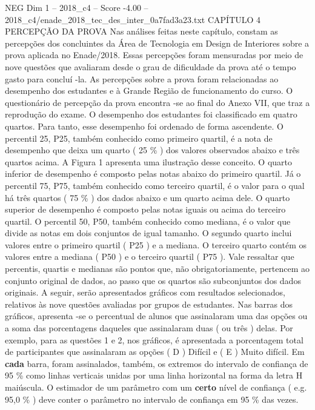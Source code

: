 \begin{textsample}{NEG Dim 1 – 2018\_c4 – Score -4.00 – 2018\_c4/enade\_2018\_tec\_des\_inter\_0a7fad3a23.txt}  \label{ex:f1_neg_132}
CAPÍTULO 4 PERCEPÇÃO DA PROVA Nas análises feitas neste capítulo, constam as percepções dos concluintes da Área de Tecnologia em Design de Interiores sobre a prova aplicada no Enade/2018.
Essas percepções foram mensuradas por meio de nove questões que avaliaram desde o grau de dificuldade da prova até o tempo gasto para concluí -la.
As percepções sobre a prova foram relacionadas ao desempenho dos estudantes e à Grande Região de funcionamento do curso.
O questionário de percepção da prova encontra -se ao final do Anexo VII, que traz a reprodução do exame.
O desempenho dos estudantes foi classificado em quatro quartos.
Para tanto, esse desempenho foi ordenado de forma ascendente.
O percentil 25, P25, também conhecido como primeiro quartil, é a nota de desempenho que deixa um quarto ( 25 \% ) dos valores observados abaixo e três quartos acima.
A Figura 1 apresenta uma ilustração desse conceito.
O quarto inferior de desempenho é composto pelas notas abaixo do primeiro quartil.
Já o percentil 75, P75, também conhecido como terceiro quartil, é o valor para o qual há três quartos ( 75 \% ) dos dados abaixo e um quarto acima dele.
O quarto superior de desempenho é composto pelas notas iguais ou acima do terceiro quartil.
O percentil 50, P50, também conhecido como mediana, é o valor que divide as notas em dois conjuntos de igual tamanho.
O segundo quarto inclui valores entre o primeiro quartil ( P25 ) e a mediana.
O terceiro quarto contém os valores entre a mediana ( P50 ) e o terceiro quartil ( P75 ).
Vale ressaltar que percentis, quartis e medianas são pontos que, não obrigatoriamente, pertencem ao conjunto original de dados, ao passo que os quartos são subconjuntos dos dados originais.
A seguir, serão apresentados gráficos com resultados selecionados, relativos às nove questões avaliadas por grupos de estudantes.
Nas barras dos gráficos, apresenta -se o percentual de alunos que assinalaram uma das opções ou a soma das porcentagens daqueles que assinalaram duas ( ou três ) delas.
Por exemplo, para as questões 1 e 2, nos gráficos, é apresentada a porcentagem total de participantes que assinalaram as opções ( D ) Difícil e ( E ) Muito difícil.
Em \textbf{cada} barra, foram assinalados, também, os extremos do intervalo de confiança de 95 \% como linhas verticais unidas por uma linha horizontal na forma da letra H maiúscula.
O estimador de um parâmetro com um \textbf{certo} nível de confiança ( e.g. 95,0 \% ) deve conter o parâmetro no intervalo de confiança em 95 \% das vezes.

\end{textsample}
